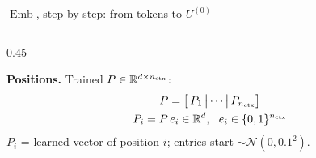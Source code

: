 \documentclass[aspectratio=169,11pt]{beamer}
\newcommand{\Emb}{\operatorname{Emb}}
\begin{document}
\begin{frame}[t]{$\Emb$, step by step: from tokens to $U^{(0)}$}
\begin{columns}[T]
\begin{column}{0.45\textwidth}
\begin{center}
\end{center}
\begin{bxrem}
\footnotesize\textbf{Positions.} Trained $P\in\mathbb{R}^{d\times n_{\rm ctx}}$:
\begin{gather*}
P=\big[\,P_1\,\big|\cdots\big|\,P_{n_{\rm ctx}}\big]\\
P_i=P\,e_i\in\mathbb{R}^d,\ \ e_i\in\{0,1\}^{n_{\rm ctx}}
\end{gather*}
$P_i$ = learned vector of position $i$; entries start $\sim\mathcal N(0,0.1^2)$.
\end{bxrem}
\end{column}
\end{columns}
\end{frame}
\end{document}
